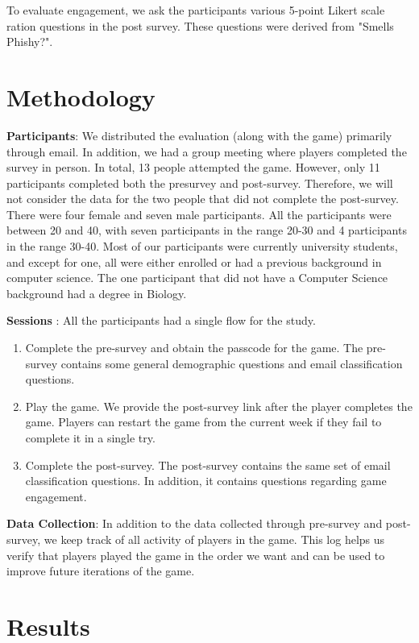To evaluate engagement, we ask the participants various 5-point Likert scale ration questions in the post survey. These questions were derived from "Smells Phishy?"\cite{smels_phishy}.


\section{Methodology}
\textbf{Participants}: We distributed the evaluation (along with the game) primarily through email. In addition, we had a group meeting where players completed the survey in person. In total, 13 people attempted the game. However, only 11 participants completed both the presurvey and post-survey. Therefore, we will not consider the data for the two people that did not complete the post-survey. There were four female and seven male participants. All the participants were between 20 and 40, with seven participants in the range 20-30 and 4 participants in the range 30-40. Most of our participants were currently university students, and except for one, all were either enrolled or had a previous background in computer science. The one participant that did not have a Computer Science background had a degree in Biology.

\textbf{Sessions} : All the participants had a single flow for the study.
\begin{enumerate}
    \setlength{\itemsep}{0pt}
    \setlength{\parskip}{0pt}
    \setlength{\topsep}{0pt}
    \item Complete the pre-survey and obtain the passcode for the game. The pre-survey contains some general demographic questions and email classification questions.
    \item  Play the game. We provide the post-survey link after the player completes the game. Players can restart the game from the current week if they fail to complete it in a single try.
    \item Complete the post-survey. The post-survey contains the same set of email classification questions. In addition, it contains questions regarding game engagement.
\end{enumerate}

\textbf{Data Collection}: In addition to the data collected through pre-survey and post-survey, we keep track of all activity of players in the game. This log helps us verify that players played the game in the order we want and can be used to improve future iterations of the game.

\section{Results}
